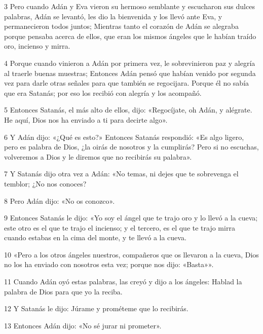 \par 3 Pero cuando Adán y Eva vieron su hermoso semblante y escucharon sus dulces palabras, Adán se levantó, les dio la bienvenida y los llevó ante Eva, y permanecieron todos juntos; Mientras tanto el corazón de Adán se alegraba porque pensaba acerca de ellos, que eran los mismos ángeles que le habían traído oro, incienso y mirra.

\par 4 Porque cuando vinieron a Adán por primera vez, le sobrevinieron paz y alegría al traerle buenas muestras; Entonces Adán pensó que habían venido por segunda vez para darle otras señales para que también se regocijara. Porque él no sabía que era Satanás; por eso los recibió con alegría y los acompañó.

\par 5 Entonces Satanás, el más alto de ellos, dijo: «Regocíjate, oh Adán, y alégrate. He aquí, Dios nos ha enviado a ti para decirte algo».

\par 6 Y Adán dijo: «¿Qué es esto?» Entonces Satanás respondió: «Es algo ligero, pero es palabra de Dios, ¿la oirás de nosotros y la cumplirás? Pero si no escuchas, volveremos a Dios y le diremos que no recibirás su palabra».

\par 7 Y Satanás dijo otra vez a Adán: «No temas, ni dejes que te sobrevenga el temblor; ¿No nos conoces?

\par 8 Pero Adán dijo: «No os conozco».

\par 9 Entonces Satanás le dijo: «Yo soy el ángel que te trajo oro y lo llevó a la cueva; este otro es el que te trajo el incienso; y el tercero, es el que te trajo mirra cuando estabas en la cima del monte, y te llevó a la cueva.

\par 10 «Pero a los otros ángeles nuestros, compañeros que os llevaron a la cueva, Dios no los ha enviado con nosotros esta vez; porque nos dijo: «Basta»».

\par 11 Cuando Adán oyó estas palabras, las creyó y dijo a los ángeles: Hablad la palabra de Dios para que yo la reciba.

\par 12 Y Satanás le dijo: Júrame y prométeme que lo recibirás.

\par 13 Entonces Adán dijo: «No sé jurar ni prometer».

